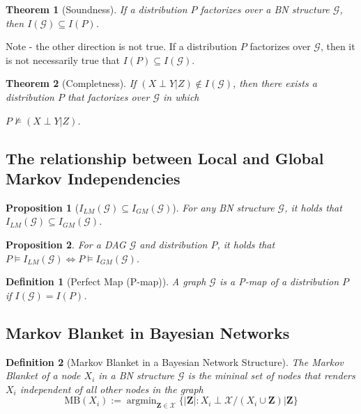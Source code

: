 \documentclass[11pt]{article}
\numberwithin{equation}{section}
\DeclareMathOperator*{\argmin}{argmin}
\theoremstyle{boldStyle}
\theoremstyle{boldBlueStyle}
\newtheorem{proposition}{Proposition}[section]
\theoremstyle{boldPurpleStyle}
\newtheorem{theorem}{Theorem}[section]
\theoremstyle{boldRedStyle}
\newtheorem{definition}{Definition}[section]
\begin{document}
\begin{theorem}[Soundness]
    If a distribution $P$ factorizes over a BN structure $\mathcal{G}$, then $I(\mathcal{G}) \subseteq I(P)$.
\end{theorem}
Note - the other direction is not true. If a distribution $P$ factorizes over $\mathcal{G}$, then it is not necessarily true that $I(P) \subseteq I(\mathcal{G})$.

\begin{theorem}[Completness]
    If $(X \perp Y | Z) \notin I(\mathcal{G})$, then there exists a distribution $P$ that factorizes over $\mathcal{G}$ in which 
    
    $P \not\models (X \perp Y | Z)$.
\end{theorem}


\subsection{The relationship between Local and Global Markov Independencies}

\begin{proposition}[$I_{LM}(\mathcal{G}) \subseteq I_{GM}(\mathcal{G})$]
    For any BN structure $\mathcal{G}$, it holds that $I_{LM}(\mathcal{G}) \subseteq I_{GM}(\mathcal{G})$.
\end{proposition}

\begin{proposition}
    For a DAG $\mathcal{G}$ and distribution $P$,  it holds that $P \models I_{LM}(\mathcal{G}) \iff P \models I_{GM}(\mathcal{G})$.
\end{proposition}

\begin{definition}[Perfect Map (P-map)]
    A graph $\mathcal{G}$ is a P-map of a distribution $P$ if $I(\mathcal{G}) = I(P)$.
\end{definition}


\subsection{Markov Blanket in Bayesian Networks}

\begin{definition}[Markov Blanket in a Bayesian Network Structure]
    The Markov Blanket of a node $X_i$ in a BN structure $\mathcal{G}$ is the mininal set of nodes that renders $X_i$ independent of all other nodes in the graph
    \begin{equation*}
        \text{MB}(X_i) := \argmin_{\textbf{Z} \in \mathcal{X}} \{ |\textbf{Z}| : X_i \perp \mathcal{X} / ({X_i} \cup \textbf{Z}) | \textbf{Z} \}
    \end{equation*}
\end{definition}
\end{document}
